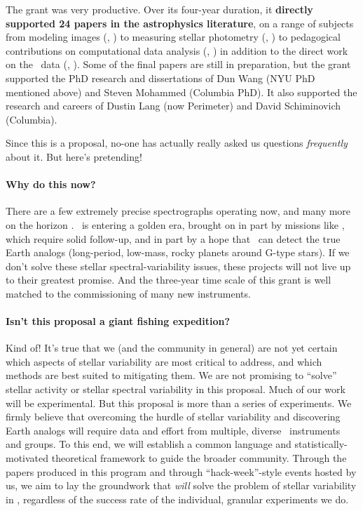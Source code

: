 \documentclass[12pt, letterpaper]{article}
\begin{document}
The grant was very productive. Over its four-year duration, it
\textbf{directly supported 24 papers in the astrophysics literature}, on a
range of subjects from modeling images (\eg, \citealt{UNWISE})
to measuring stellar photometry (\eg, \citealt{CPM})
to pedagogical contributions on computational data analysis (\eg, \citealt{MCMC})
in addition to the direct work on the \GALEX\ data (\eg, \citealt{Mohammed}).
Some of the final papers are still in preparation, but the grant
supported the PhD research and dissertations of Dun Wang (NYU PhD
mentioned above) and Steven Mohammed (Columbia PhD).
It also supported the research and careers of Dustin Lang (now
Perimeter) and David Schiminovich (Columbia).


Since this is a proposal, no-one has actually really asked us
questions \emph{frequently} about it.
But here's pretending!

\paragraph{Why do this now?}
There are a few extremely precise spectrographs operating now, 
and many more on the horizon \citep{Wright2017}.
\EPRV\ is entering a golden era, brought on in part by missions like
\TESS, which require solid follow-up, and in part by a hope that
\EPRV\ can detect the true Earth analogs (long-period, low-mass, rocky
planets around G-type stars).
If we don't solve these stellar spectral-variability issues, these
projects will not live up to their greatest promise.
And the three-year time scale of this grant is well matched to the
commissioning of many new instruments.

\paragraph{Isn't this proposal a giant fishing expedition?}
Kind of! It's true that we (and the community in general) are not yet certain 
which aspects of stellar variability are most critical to address, and which 
methods are best suited to mitigating them. We are not promising to 
``solve'' stellar activity or stellar spectral variability in this proposal.
Much of our work will be 
experimental. But this proposal is more than a series of experiments. 
We firmly believe that overcoming the hurdle of stellar variability and 
discovering Earth analogs will require data and effort from multiple, 
diverse \EPRV\ instruments and groups. To this end, we will establish 
a common language and statistically-motivated theoretical framework 
to guide the broader community. Through the papers produced in this 
program and through ``hack-week''-style events hosted by us, we aim to 
lay the groundwork that \textit{will} solve the problem of stellar variability 
in \EPRV, regardless of the success rate of the individual, granular experiments we do. 
\end{document}

